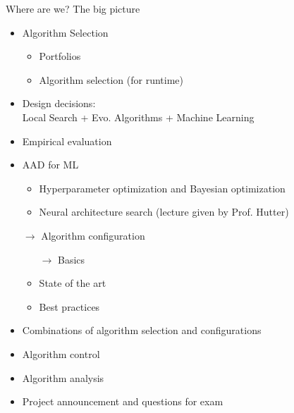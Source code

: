\begin{frame}[c]{Where are we? The big picture}

\begin{itemize}
\item Algorithm Selection
  \begin{itemize}
    \item Portfolios
    \item Algorithm selection (for runtime)
  \end{itemize}
  \item Design decisions:\\ Local Search + Evo. Algorithms + Machine Learning 
  \item Empirical evaluation
  \item AAD for ML
  \begin{itemize}
    \item Hyperparameter optimization and Bayesian optimization 
    \item Neural architecture search (lecture given by Prof. Hutter)
  \end{itemize}
  \item[$\to$] Algorithm configuration 
  \begin{itemize}
    \item[$\to$] Basics 
    \item State of the art 
    \item Best practices 
  \end{itemize}
  \item Combinations of algorithm selection and configurations
  \item Algorithm control 
  \item Algorithm analysis 
  \item Project announcement and questions for exam 
\end{itemize}

\end{frame}


